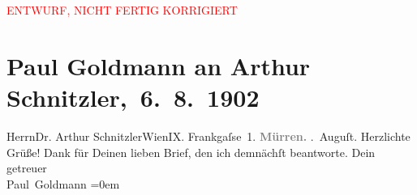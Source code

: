
\begin{center}
            \textcolor{red}{ENTWURF, NICHT FERTIG KORRIGIERT}
                      \end{center}
            
         \renewcommand{\erwaehnteOrte}{Orte: Frankgasse, Mürren, Wien}
         \renewcommand{\erwaehnteWerke}{}
               \section[ Paul Goldmann an Arthur Schnitzler, 6. 8. 1902]{ Paul Goldmann an Arthur Schnitzler, 6. 8. 1902}\nopagebreak{}\rehead{ }\begin{ledgroupsized}[t]{13cm}\normalsize\beginnumbering \toendnotes[C]{\smallbreak\pagebreak[2]} 
\pstart{}{\pb}Herrn\pend{}\pstart{}Dr. Arthur Schnitzler\pend{}\pstart{}Wien\pend{}\pstart{}IX. Frankgaſse 1.\pend{}{\bigskip}\pstart
           \noindent{}\centering{}{\pb}\textcolor{gray}{\textbf{Mürren.}}\pend
           . Auguſt.\pend
           \pstart
           Herzlichte Grüße! Dank für Deinen lieben Brief, den ich demnächſt beantworte.\pend
           \pstart
           Dein {\\[\baselineskip]}getreuer {\\[\baselineskip]}\spacefill\mbox{Paul Goldmann}\pend
           \leftskip=0em{}
         
         \endnumbering{}\end{ledgroupsized}  \newcommand{\dateiname}{L03217}\newcommand{\titel}{Paul Goldmann an Arthur Schnitzler, 6. 8. 1902}\newcommand{\editorInnen}{Martin Anton Müller und Laura Untner}
      